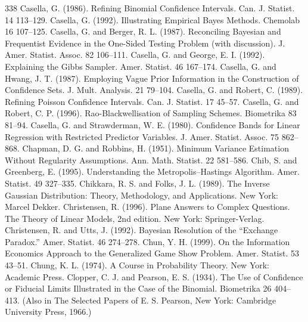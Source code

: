 \begin{thebibliography}{338}
\label{bib:source64} Casella, G. (1986). Refining Binomial Confidence Intervals. Can. J. Statist. 14 113–129.
\label{bib:source65} Casella, G. (1992). Illustrating Empirical Bayes Methods. Chemolab 16 107–125.
\label{bib:source66} Casella, G. and Berger, R. L. (1987). Reconciling Bayesian and Frequentist Evidence in the One-Sided Testing Problem (with discussion). J. Amer. Statist. Assoc. 82 106–111.
\label{bib:source67} Casella, G. and George, E. I. (1992). Explaining the Gibbs Sampler. Amer. Statist. 46 167–174.
\label{bib:source68} Casella, G. and Hwang, J. T. (1987). Employing Vague Prior Information in the Construction of Confidence Sets. J. Mult. Analysis. 21 79–104.
\label{bib:source69} Casella, G. and Robert, C. (1989). Refining Poisson Confidence Intervals. Can. J. Statist. 17 45–57.
\label{bib:source70} Casella, G. and Robert, C. P. (1996). Rao-Blackwellisation of Sampling Schemes. Biometrika 83 81–94.
\label{bib:source71} Casella, G. and Strawderman, W. E. (1980). Confidence Bands for Linear Regression with Restricted Predictor Variables. J. Amer. Statist. Assoc. 75 862–868.
\label{bib:source72} Chapman, D. G. and Robbins, H. (1951). Minimum Variance Estimation Without Regularity Assumptions. Ann. Math. Statist. 22 581–586.
\label{bib:source73} Chib, S. and Greenberg, E. (1995). Understanding the Metropolis–Hastings Algorithm. Amer. Statist. 49 327–335.
\label{bib:source74} Chikkara, R. S. and Folks, J. L. (1989). The Inverse Gaussian Distribution: Theory, Methodology, and Applications. New York: Marcel Dekker.
\label{bib:source75} Christensen, R. (1996). Plane Answers to Complex Questions. The Theory of Linear Models, 2nd edition. New York: Springer-Verlag.
\label{bib:source76} Christensen, R. and Utts, J. (1992). Bayesian Resolution of the “Exchange Paradox.” Amer. Statist. 46 274–278.
\label{bib:source77} Chun, Y. H. (1999). On the Information Economics Approach to the Generalized Game Show Problem. Amer. Statist. 53 43–51.
\label{bib:source78} Chung, K. L. (1974). A Course in Probability Theory. New York: Academic Press.
\label{bib:source79} Clopper, C. J. and Pearson, E. S. (1934). The Use of Confidence or Fiducial Limits Illustrated in the Case of the Binomial. Biometrika 26 404–413. (Also in The Selected Papers of E. S. Pearson, New York: Cambridge University Press, 1966.)

\end{thebibliography}
